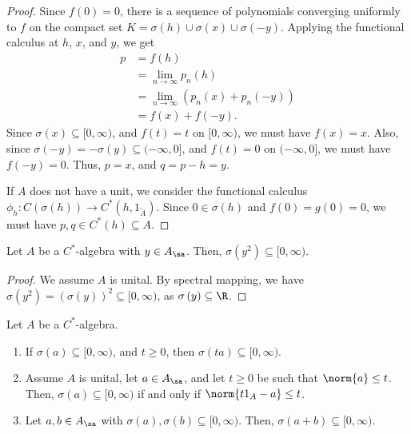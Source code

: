 \documentclass[10pt]{mypackage}
\begin{document}
\begin{proof}
Since $f(0) = 0$, there is a sequence of polynomials converging uniformly to $f$ on the compact set $K = \sigma\left(h\right) \cup \sigma\left(x\right) \cup \sigma\left(-y\right)$. Applying the functional calculus at $h$, $x$, and $y$, we get
\begin{align*}
  p &= f\left(h\right)\\
    &= \lim_{n\rightarrow\infty}p_n\left(h\right)\\
    &= \lim_{n\rightarrow\infty}\left(p_n\left(x\right) + p_n\left(-y\right)\right)\\
    &= f(x) + f\left(-y\right).
\end{align*}
Since $\sigma\left(x\right)\subseteq [0,\infty)$, and $f(t) = t$ on $[0,\infty)$, we must have $f(x) = x$. Also, since $\sigma\left(-y\right) = -\sigma\left(y\right) \subseteq (-\infty,0]$, and $f(t) = 0$ on $(-\infty,0]$, we must have $f(-y) = 0$. Thus, $p = x$, and $q = p - h = y$.\newline

If $A$ does not have a unit, we consider the functional calculus $\phi_h\colon C\left(\sigma\left(h\right)\right)\rightarrow C^{\ast}\left(h,1_{\widetilde{A}}\right)$. Since $0\in \sigma\left(h\right)$ and $f(0) = g(0) = 0$, we must have $p,q\in C^{\ast}\left(h\right)\subseteq A$.
\end{proof}
\begin{lemma}
  Let $A$ be a $C^{\ast}$-algebra with $y\in A_{\sa}$. Then, $\sigma\left(y^2\right) \subseteq [0,\infty)$.
\end{lemma}
\begin{proof}
  We assume $A$ is unital. By spectral mapping, we have $\sigma\left(y^2\right) = \left(\sigma\left(y\right)\right)^2 \subseteq [0,\infty)$, as $\sigma\left(y\right)\subseteq \R$.
\end{proof}
\begin{lemma}
  Let $A$ be a $C^{\ast}$-algebra.
  \begin{enumerate}[(1)]
    \item If $\sigma\left(a\right)\subseteq [0,\infty)$, and $t\geq 0$, then $\sigma\left(ta\right)\subseteq [0,\infty)$.
    \item Assume $A$ is unital, let $a\in A_{\sa}$, and let $t\geq 0$ be such that $\norm{a}\leq t$. Then, $\sigma\left(a\right)\subseteq [0,\infty)$ if and only if $\norm{t1_A - a} \leq t$.
    \item Let $a,b\in A_{\sa}$ with $\sigma\left(a\right),\sigma\left(b\right)\subseteq [0,\infty)$. Then, $\sigma\left(a+b\right)\subseteq [0,\infty)$.
  \end{enumerate}
\end{lemma}
\end{document}
